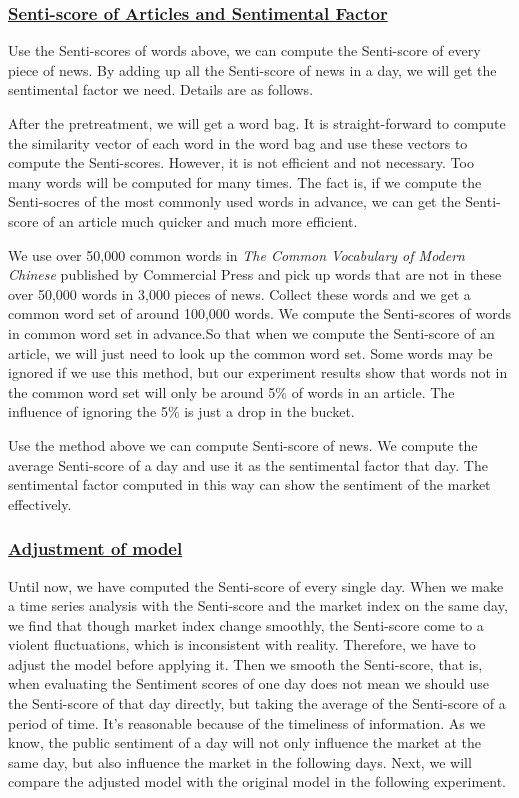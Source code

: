 \documentclass[10pt, conference, compsocconf]{IEEEtran}
\begin{document}
\subsubsection{\underline{Senti-score of Articles and Sentimental Factor}}

Use the Senti-scores of words above, we can compute the Senti-score of every piece of news. By adding up all the Senti-score of news in a day, we will get the sentimental factor we need. Details are as follows.

After the pretreatment, we will get a word bag. It is straight-forward to compute the similarity vector of each word in the word bag and use these vectors to compute the Senti-scores. However, it is not efficient and not necessary. Too many words will be computed for many times. The fact is, if we compute the Senti-socres of the most commonly used words in advance, we can get the Senti-score of an article much quicker and much more efficient.

We use over 50,000 common words in \emph{The Common Vocabulary of Modern Chinese} published by Commercial Press and pick up words that are not in these over 50,000 words in 3,000 pieces of news. Collect these words and we get a common word set of around 100,000 words. We compute the Senti-scores of words in common word set in advance.So that when we compute the Senti-score of an article, we will just need to look up the common word set. Some words may be ignored if we use this method, but our experiment results show that words not in the common word set will only be around 5\% of words in an article. The influence of ignoring the 5\% is just a drop in the bucket.

Use the method above we can compute Senti-score of news. We compute the average Senti-score of a day and use it as the sentimental factor that day. The sentimental factor computed in this way can show the sentiment of the market effectively.

\subsubsection{\underline{Adjustment of model}}

Until now, we have computed the Senti-score of every single day. When we make a time series analysis with the Senti-score and the market index on the same day, we find that though market index change smoothly, the Senti-score come to a violent fluctuations, which is inconsistent with reality. Therefore, we have to adjust the model before applying it. Then we smooth the Senti-score, that is, when evaluating the Sentiment scores of one day does not mean we should use the Senti-score of that day directly, but taking the average of the Senti-score of a period of time. It's reasonable because of the timeliness of information. As we know, the public sentiment of a day will not only influence the market at the same day, but also influence the market in the following days. Next, we will compare the adjusted model with the original model in the following experiment.
\end{document}
